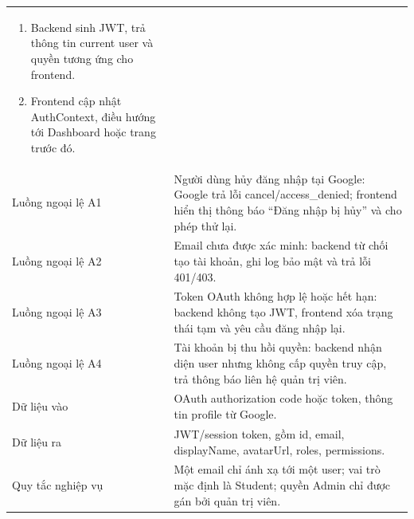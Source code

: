 \documentclass[12pt,a4paper]{report}
\begin{document}
\begin{longtable}{L{4cm} L{10.5cm}}
\begin{enumerate}[leftmargin=*]
\item Backend sinh JWT, trả thông tin current user và quyền tương ứng cho frontend.
\item Frontend cập nhật AuthContext, điều hướng tới Dashboard hoặc trang trước đó.
\end{enumerate} \\
Luồng ngoại lệ A1 & Người dùng hủy đăng nhập tại Google: Google trả lỗi cancel/access\_denied; frontend hiển thị thông báo ``Đăng nhập bị hủy'' và cho phép thử lại. \\
Luồng ngoại lệ A2 & Email chưa được xác minh: backend từ chối tạo tài khoản, ghi log bảo mật và trả lỗi 401/403. \\
Luồng ngoại lệ A3 & Token OAuth không hợp lệ hoặc hết hạn: backend không tạo JWT, frontend xóa trạng thái tạm và yêu cầu đăng nhập lại. \\
Luồng ngoại lệ A4 & Tài khoản bị thu hồi quyền: backend nhận diện user nhưng không cấp quyền truy cập, trả thông báo liên hệ quản trị viên. \\
Dữ liệu vào & OAuth authorization code hoặc token, thông tin profile từ Google. \\
Dữ liệu ra & JWT/session token,  gồm id, email, displayName, avatarUrl, roles, permissions. \\
Quy tắc nghiệp vụ & Một email chỉ ánh xạ tới một user; vai trò mặc định là Student; quyền Admin chỉ được gán bởi quản trị viên. \\
\bottomrule
\end{longtable}
\end{document}
